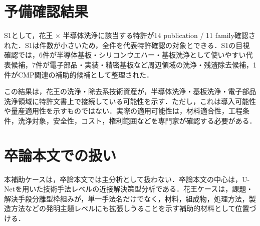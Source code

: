\section{予備確認結果}
S1として，花王 $\times$ 半導体洗浄に該当する特許が14 publication / 11 family確認された．S1は件数が小さいため，全件を代表特許確認の対象とできる．S1の目視確認では，6件が半導体基板・シリコンウエハー・基板洗浄として使いやすい代表候補，7件が電子部品・実装・精密基板など周辺領域の洗浄・残渣除去候補，1件がCMP関連の補助的候補として整理された．

この結果は，花王の洗浄・除去系技術資産が，半導体洗浄・基板洗浄・電子部品洗浄領域に特許文書上で接続している可能性を示す．ただし，これは導入可能性や量産適用性を示すものではない．実際の適用可能性は，材料適合性，工程条件，洗浄対象，安全性，コスト，権利範囲などを専門家が確認する必要がある．

\section{卒論本文での扱い}
本補助ケースは，卒論本文では主分析として扱わない．卒論本文の中心は，U-Netを用いた技術手法レベルの近接解決策型分析である．花王ケースは，課題・解決手段分離型枠組みが，単一手法名だけでなく，材料，組成物，処理方法，製造方法などの発明主題レベルにも拡張しうることを示す補助的材料として位置づける．
